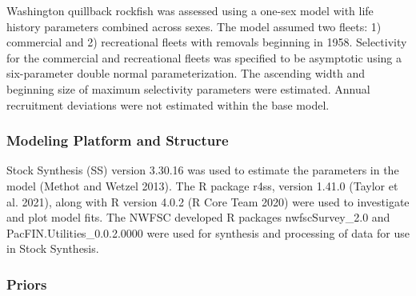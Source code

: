 \documentclass[11pt,
  english,
  a4paper,
]{article}
\begin{document}
\leavevmode\tagmcend\tagstructend


Washington quillback rockfish was assessed using a one-sex model with life history parameters combined across sexes. The model assumed two fleets: 1) commercial and 2) recreational fleets with removals beginning in 1958. Selectivity for the commercial and recreational fleets was specified to be asymptotic using a six-parameter double normal parameterization. The ascending width and beginning size of maximum selectivity parameters were estimated. Annual recruitment deviations were not estimated within the base model.

\leavevmode\tagmcend\tagstructend\par


\hypertarget{modeling-platform-and-structure}{%
\subsubsection{Modeling Platform and Structure}\label{modeling-platform-and-structure}}

\leavevmode\tagmcend\tagstructend


Stock Synthesis (SS) version 3.30.16 was used to estimate the parameters in the model {(Methot and Wetzel 2013)\leavevmode\tagmcend\tagstructend}. The R package r4ss, version 1.41.0 {(Taylor et al. 2021)\leavevmode\tagmcend\tagstructend}, along with R version 4.0.2 {(R Core Team 2020)\leavevmode\tagmcend\tagstructend} were used to investigate and plot model fits. The NWFSC developed R packages nwfscSurvey\_2.0 and PacFIN.Utilities\_0.0.2.0000 were used for synthesis and processing of data for use in Stock Synthesis.

\leavevmode\tagmcend\tagstructend\par


\hypertarget{priors}{%
\subsubsection{Priors}\label{priors}}
\end{document}
